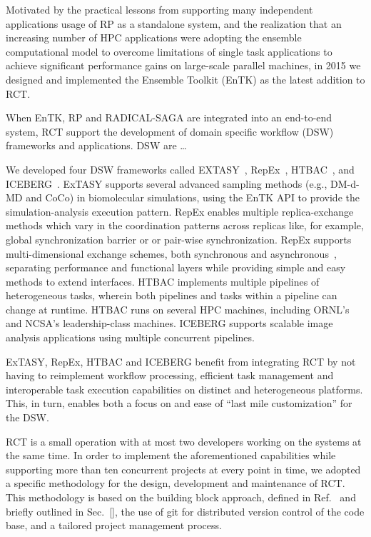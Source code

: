 \documentclass[preprint,12pt, a4paper]{elsarticle}
\begin{document}

Motivated by the practical lessons from supporting many independent
applications usage of RP as a standalone system, and the realization that an
increasing number of HPC applications were adopting the ensemble computational
model to overcome limitations of single task applications to achieve
significant performance gains on large-scale parallel machines, in 2015 we
designed and implemented the Ensemble Toolkit (EnTK) as the latest addition to
RCT.

When EnTK, RP and RADICAL-SAGA are integrated into an end-to-end system, RCT
support the development of domain specific workflow (DSW) frameworks and
applications. DSW are \ldots

We developed four DSW frameworks called
EXTASY~\cite{balasubramanian2016extasy}, RepEx~\cite{treikalis2016repex},
HTBAC~\cite{dakka2018high}, and ICEBERG~\cite{}. ExTASY supports several
advanced sampling methods (e.g., DM-d-MD and CoCo) in biomolecular
simulations, using the EnTK API to provide the simulation-analysis execution
pattern. RepEx enables multiple replica-exchange methods which vary in the
coordination patterns across replicas like, for example, global
synchronization barrier or or pair-wise synchronization. RepEx supports
multi-dimensional exchange schemes, both synchronous and
asynchronous~\cite{radak2015characterization}, separating performance and
functional layers while providing simple and easy methods to extend
interfaces. HTBAC implements multiple pipelines of heterogeneous tasks,
wherein both pipelines and tasks within a pipeline can change at runtime.
HTBAC runs on several HPC machines, including ORNL's and NCSA's
leadership-class machines. ICEBERG supports scalable image analysis
applications using multiple concurrent pipelines.

ExTASY, RepEx, HTBAC and ICEBERG benefit from integrating RCT by not
having to reimplement workflow processing, efficient task management and
interoperable task execution capabilities on distinct and heterogeneous
platforms. This, in turn, enables both a focus on and ease of ``last mile
customization'' for the DSW\@.

RCT is a small operation with at most two developers working on the systems
at the same time. In order to implement the aforementioned capabilities while
supporting more than ten concurrent projects at every point in time, we
adopted a specific methodology for the design, development and maintenance of
RCT. This methodology is based on the building block approach, defined in
Ref.~\cite{bb} and briefly outlined in Sec.~\ref{}, the use of git for
distributed version control of the code base, and a tailored project
management process.
\end{document}
